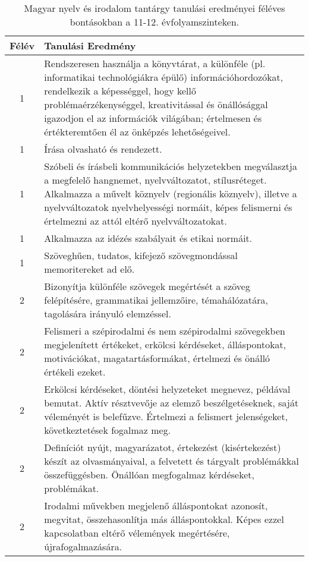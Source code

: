        
           \begin{longtable}{c | p{12cm} }
            \caption[Magyar nyelv és irodalom 11-12.]{Magyar nyelv és irodalom tantárgy tanulási eredményei féléves bontásokban a 11-12. évfolyamszinteken. }  \\

            \textbf{Félév} & \textbf{Tanulási Eredmény} \\
            \hline
            \endhead
                                
                                          1 &  Rendszeresen használja a könyvtárat, a különféle (pl. informatikai technológiákra épülő) információhordozókat, rendelkezik a képességgel, hogy kellő problémaérzékenységgel, kreativitással és önállósággal igazodjon el az információk világában; értelmesen és értékteremtően él az önképzés lehetőségeivel. \\ \hline
                                          1 &  Írása olvasható és rendezett. \\ \hline
                                          1 &  Szóbeli és írásbeli kommunikációs helyzetekben megválasztja a megfelelő hangnemet, nyelvváltozatot, stílusréteget. Alkalmazza a művelt köznyelv (regionális köznyelv), illetve a nyelvváltozatok nyelvhelyességi normáit, képes felismerni és értelmezni az attól eltérő nyelvváltozatokat. \\ \hline
                                          1 &  Alkalmazza az idézés szabályait és etikai normáit. \\ \hline
                                          1 &  Szöveghűen, tudatos, kifejező szövegmondással memoritereket ad elő. \\ \hline
                                      
                                
                                          2 &  Bizonyítja különféle szövegek megértését a szöveg felépítésére, grammatikai jellemzőire, témahálózatára, tagolására irányuló elemzéssel. \\ \hline
                                          2 &  Felismeri a szépirodalmi és nem szépirodalmi szövegekben megjelenített értékeket, erkölcsi kérdéseket, álláspontokat, motivációkat, magatartásformákat, értelmezi és önálló értékeli ezeket. \\ \hline
                                          2 &  Erkölcsi kérdéseket, döntési helyzeteket megnevez, példával bemutat. Aktív résztvevője az elemző beszélgetéseknek, saját véleményét is belefűzve. Értelmezi a felismert jelenségeket, következtetések fogalmaz meg. \\ \hline
                                          2 &  Definíciót nyújt, magyarázatot, értekezést (kisértekezést) készít az olvasmányaival, a felvetett  és tárgyalt problémákkal összefüggésben. Önállóan megfogalmaz kérdéseket, problémákat. \\ \hline
                                          2 &  Irodalmi művekben megjelenő álláspontokat azonosít, megvitat, összehasonlítja más álláspontokkal. Képes ezzel kapcsolatban eltérő vélemények megértésére, újrafogalmazására. \\ \hline
                                      

\end{longtable}
